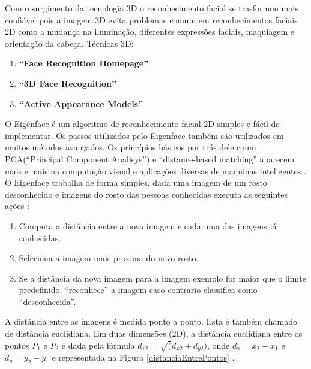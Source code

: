 Com o surgimento da tecnologia 3D o reconhecimento facial se trasformou mais confiável pois a imagem 3D evita problemas comum em reconhecimentos faciais 2D como a mudança na iluminação, diferentes expressões faciais, maquiagem e orientação da cabeça.
	Técnicas 3D:
	\begin{enumerate}
		\item \textbf{``Face Recognition Homepage''}
		\item \textbf{``3D Face Recognition''}
		\item \textbf{``Active Appearance Models''}
	\end{enumerate}


O Eigenface é um algoritmo de reconhecimento facial 2D simples e fácil de implementar. Os passos utilizados pelo Eigenface também são utilizados em muitos métodos avançados. Os princípios básicos por trás dele como PCA(``Principal Component Analisys'') e ``distance-based matching'' aparecem mais e mais na computação visual e aplicações diversas de maquinas inteligentes \cite{hewitt}.
O Eigenface trabalha de forma simples, dada uma imagem de um rosto desconhecido e imagens do rosto das pessoas conhecidas executa as seguintes ações \cite{hewitt}:
	\begin{enumerate}
		\item Computa a distância entre a nova imagem e cada uma das imagens já conhecidas.
		\item Seleciona a imagem mais proxima do novo rosto.
		\item Se a distância da nova imagem para a imagem exemplo for maior que o limite predefinido, ``reconhece'' a imagem caso contrario classifica como ``desconhecida''.
	\end{enumerate}


A distância entre as imagens é medida ponto a ponto. Esta é também chamado de distância euclidiana. Em duas dimensões (2D), a distância euclidiana entre os pontos $P_1$ e $P_2$ é dada pela fórmula $\displaystyle d_{12} = \sqrt(d_{x2} + d_{y2})$, onde $\displaystyle d_x = x_2 - x_1$ e $\displaystyle d_y = y_2-y_1$ e representada na Figura \ref{distanciaEntrePontos} \cite{hewitt}.

